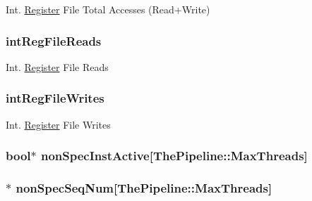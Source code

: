 \label{classUseDefUnit_abf73f69eb2ade79a3b55b431699c6d07}
Int. \hyperlink{classRegister}{Register} File Total Accesses (Read+Write) \hypertarget{classUseDefUnit_a67e958fedd10dfe72747865179154882}{
\subsubsection[{intRegFileReads}]{ {\bf intRegFileReads}}}
\label{classUseDefUnit_a67e958fedd10dfe72747865179154882}
Int. \hyperlink{classRegister}{Register} File Reads \hypertarget{classUseDefUnit_aa79e36dab324cdcb339de91d5b21f03b}{
\subsubsection[{intRegFileWrites}]{ {\bf intRegFileWrites}}}
\label{classUseDefUnit_aa79e36dab324cdcb339de91d5b21f03b}
Int. \hyperlink{classRegister}{Register} File Writes \hypertarget{classUseDefUnit_aa27d1c9b589af0c77a81c490021c7dcb}{
\subsubsection[{nonSpecInstActive}]{\setlength{\rightskip}{0pt plus 5cm}bool$\ast$ {\bf nonSpecInstActive}\mbox{[}{\bf ThePipeline::MaxThreads}\mbox{]}}}
\label{classUseDefUnit_aa27d1c9b589af0c77a81c490021c7dcb}
\hypertarget{classUseDefUnit_a899b1bc10d38a0f725495bf2108479a3}{
\subsubsection[{nonSpecSeqNum}]{$\ast$ {\bf nonSpecSeqNum}\mbox{[}{\bf ThePipeline::MaxThreads}\mbox{]}}}
